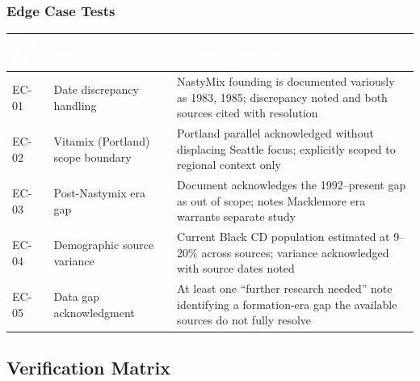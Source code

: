 \documentclass[11pt,letterpaper]{article}
\newcommand{\tableheader}[1]{\textbf{\sffamily\textcolor{white}{#1}}}
\begin{document}
\subsubsection{Edge Case Tests}

\begin{center}
\begin{tabularx}{\textwidth}{C{1.5cm}L{3.5cm}X}
\toprule
{}
\tableheader{Test ID} & \tableheader{Verifies} & \tableheader{Expected Behavior} \\
\midrule
EC-01 & Date discrepancy handling & NastyMix founding is documented variously as 1983, 1985; discrepancy noted and both sources cited with resolution \\
EC-02 & Vitamix (Portland) scope boundary & Portland parallel acknowledged without displacing Seattle focus; explicitly scoped to regional context only \\
EC-03 & Post-Nastymix era gap & Document acknowledges the 1992--present gap as out of scope; notes Macklemore era warrants separate study \\
EC-04 & Demographic source variance & Current Black CD population estimated at 9--20\% across sources; variance acknowledged with source dates noted \\
EC-05 & Data gap acknowledgment & At least one ``further research needed'' note identifying a formation-era gap the available sources do not fully resolve \\
\bottomrule
\end{tabularx}
\end{center}

\subsection{Verification Matrix}
\end{document}
